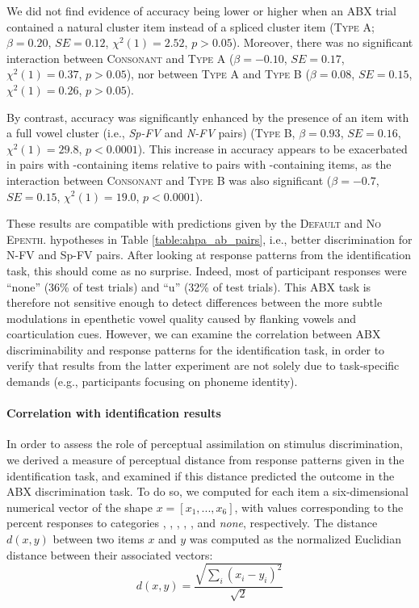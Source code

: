 We did not find evidence of accuracy being lower or higher when an ABX trial contained a natural cluster item instead of a spliced cluster item (\textsc{Type A}; $\beta = 0.20$, $SE = 0.12$, $\chi^2(1) = 2.52$, $p > 0.05$). Moreover, there was no significant interaction between \textsc{Consonant} and \textsc{Type A} ($\beta = -0.10$, $SE = 0.17$, $\chi^2(1) = 0.37$, $p > 0.05$), nor between \textsc{Type A} and \textsc{Type B} ($\beta = 0.08$, $SE = 0.15$, $\chi^2(1) = 0.26$, $p > 0.05$).

By contrast, accuracy was significantly enhanced by the presence of an item with a full vowel cluster (i.e., \textit{Sp-FV} and \textit{N-FV} pairs) (\textsc{Type B}, $\beta = 0.93$, $SE = 0.16$, $\chi^2(1) = 29.8$, $p < 0.0001$). This increase in accuracy appears to be exacerbated in pairs with -containing items relative to pairs with -containing items, as the interaction between \textsc{Consonant} and \textsc{Type B} was also significant ($\beta = -0.7$, $SE = 0.15$, $\chi^2(1) = 19.0$, $p < 0.0001$).

These results are compatible with predictions given by the \textsc{Default} and \textsc{No Epenth.} hypotheses in Table \ref{table:ahpa_ab_pairs}, i.e., better discrimination for N-FV and Sp-FV pairs. After looking at response patterns from the identification task, this should come as no surprise. Indeed, most of participant responses were ``none'' (36\% of test trials) and ``u'' (32\% of test trials). This ABX task is therefore not sensitive enough to detect differences between the more subtle modulations in epenthetic vowel quality caused by flanking vowels and coarticulation cues. However, we can examine the correlation between ABX discriminability and response patterns for the identification task, in order to verify that results from the latter experiment are not solely due to task-specific demands (e.g., participants focusing on phoneme identity).    

\paragraph{Correlation with identification results}

In order to assess the role of perceptual assimilation on stimulus discrimination, we derived a measure of perceptual distance from response patterns given in the identification task, and examined if this distance predicted the outcome in the ABX discrimination task. To do so, we computed for each item a six-dimensional numerical vector of the shape $x = [x_{1}, ..., x_{6}]$, with values corresponding to the percent responses to categories , , , , , and \textit{none}, respectively. The distance $d(x,y)$ between two items $x$ and $y$ was computed as the normalized Euclidian distance between their associated vectors:
    \[d(x,y)=\frac{\sqrt{\sum_i (x_{i} - y_{i})^{2}}} {\sqrt{2}}\]

